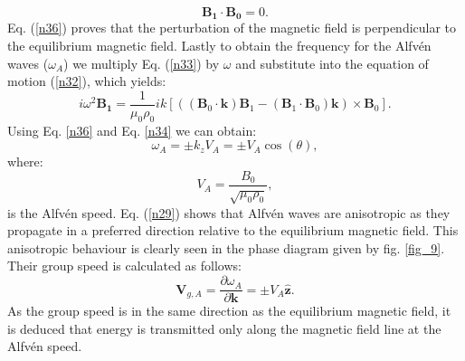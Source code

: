 \documentclass[12pt,a4paper,twoside]{article}
\newcommand{\Alfven}{Alfv\'{e}n }
\begin{document}
\begin{equation}\label{n36}
\boldsymbol{B_1} \cdot \boldsymbol{B_0} = 0.
\end{equation}     
Eq. (\ref{n36}) proves that the perturbation of the magnetic field is perpendicular to the equilibrium magnetic field. Lastly to obtain the frequency for the \Alfven waves ($\omega_A$) we multiply Eq. (\ref{n33}) by $\omega$ and substitute into the equation of motion (\ref{n32}), which yields:
\begin{equation}
i \omega^2 \boldsymbol{B_1} = \frac{1}{\mu_0 \rho_0} i k \left[ ( (\boldsymbol{B}_0 \cdot \boldsymbol{k}) \boldsymbol{B}_1 - (\boldsymbol{B}_1 \cdot \boldsymbol{B}_0) \boldsymbol{k})\times \boldsymbol{B}_0 \right] .
\end{equation}   
Using Eq. \eqref{n36} and Eq. \eqref{n34} we can obtain:
\begin{equation}\label{n29}
\omega_A = \pm k_z V_A = \pm V_A \cos(\theta),
\end{equation}  
where:
\begin{equation} \label{eq93}
V_A= \frac{B_0}{\sqrt{\mu_0 \rho_0}}, 
\end{equation}
is the \Alfven speed. Eq. (\ref{n29}) shows that \Alfven waves are anisotropic as they propagate in a preferred direction relative to the equilibrium magnetic field. This anisotropic behaviour is clearly seen in the phase diagram given by fig. \ref{fig_9}. Their group speed is calculated as follows:
\begin{equation}
\boldsymbol{V}_{g,A} = \frac{\partial \omega_A}{\partial \boldsymbol{k}} = \pm V_A \boldsymbol{\hat{z}}. 
\end{equation}  
As the group speed is in the same direction as the equilibrium magnetic field, it is deduced that energy is transmitted only along the magnetic field line at the \Alfven speed. 
\end{document}
